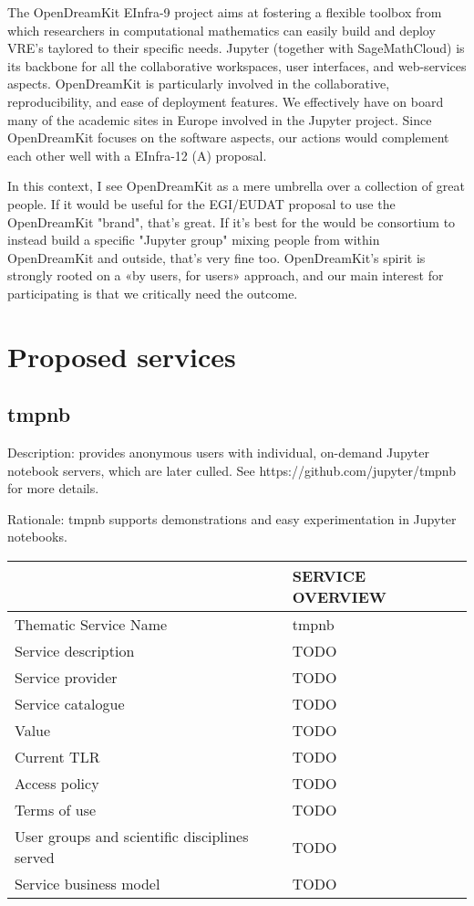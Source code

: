 The OpenDreamKit EInfra-9 project aims at fostering a flexible toolbox
from which researchers in computational mathematics can easily build
and deploy VRE's taylored to their specific needs. Jupyter (together
with SageMathCloud) is its backbone for all the collaborative
workspaces, user interfaces, and web-services aspects. OpenDreamKit is
particularly involved in the collaborative, reproducibility, and ease
of deployment features. We effectively have on board many of the
academic sites in Europe involved in the Jupyter project. Since
OpenDreamKit focuses on the software aspects, our actions would
complement each other well with a EInfra-12 (A) proposal.

In this context, I see OpenDreamKit as a mere umbrella over a
collection of great people. If it would be useful for the EGI/EUDAT
proposal to use the OpenDreamKit "brand", that's great. If it's best
for the would be consortium to instead build a specific "Jupyter
group" mixing people from within OpenDreamKit and outside, that's very
fine too.  OpenDreamKit's spirit is strongly rooted on a «by users,
for users» approach, and our main interest for participating is that
we critically need the outcome.

\section{Proposed services}

\subsection{tmpnb}

Description: provides anonymous users with individual, on-demand Jupyter
notebook servers, which are later culled. See https://github.com/jupyter/tmpnb
for more details.

Rationale: tmpnb supports demonstrations and easy experimentation in
Jupyter notebooks.

\begin{tabular}{|l|l|}
\hline
 & SERVICE OVERVIEW\\
\hline
Thematic Service Name&tmpnb\\
\hline
Service description&TODO\\
\hline
Service provider&TODO\\
\hline
Service catalogue&TODO\\
\hline
Value&TODO\\
\hline
Current TLR&TODO\\
\hline
Access policy&TODO\\
\hline
Terms of use&TODO\\
\hline
User groups and scientific disciplines served&TODO\\
\hline
Service business model&TODO\\
\hline
\end{tabular}

